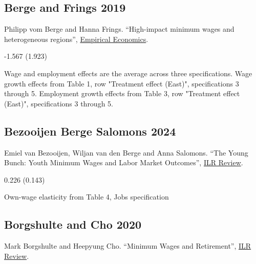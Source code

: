 \subsection*{Berge and Frings 2019}
\vspace{-0.7em}

\noindent Philipp vom Berge and Hanna Frings. ``High-impact minimum wages and heterogeneous regions'', \href{https://doi.org/10.1007/s00181-019-01661-0}{Empirical Economics}.

\vspace{0.7em}

 -1.567 (1.923)

\vspace{0.7em}

 Wage and employment effects are the average across three specifications. Wage growth effects from Table 1, row "Treatment effect (East)", specifications 3 through 5. Employment growth effects from Table 3, row "Treatment effect (East)", specifications 3 through 5.

\subsection*{Bezooijen Berge Salomons 2024}
\vspace{-0.7em}

\noindent Emiel van Bezooijen, Wiljan van den Berge and Anna Salomons. ``The Young Bunch: Youth Minimum Wages and Labor Market Outcomes'', \href{https://doi.org/10.1177/00197939241239317}{ILR Review}.

\vspace{0.7em}

 0.226 (0.143)

\vspace{0.7em}

 Own-wage elasticity from Table 4, Jobs specification

\subsection*{Borgshulte and Cho 2020}
\vspace{-0.7em}

\noindent Mark Borgshulte and Heepyung Cho. ``Minimum Wages and Retirement'', \href{https://doi.org/10.1177/0019793919845861}{ILR Review}.

\vspace{0.7em}

